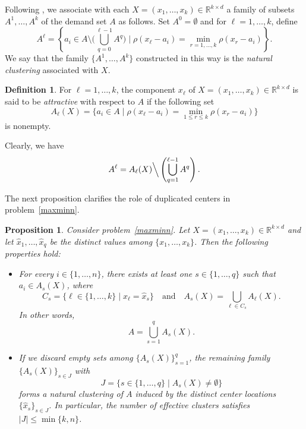 \documentclass[11pt]{article}
\newtheorem{proposition}[theorem]{Proposition}
\theoremstyle{definition}
\newtheorem{definition}[theorem]{Definition}
\newcommand{\R}{\mathbb{R}}
\newcommand{\1}{\mathbf{1}}
\begin{document}
Following \cite{Cuong2020,LNSYkcenter}, we associate with each
$X=(x_1,\ldots,x_k)\in\R^{k\times d}$ a family of subsets
$A^1,\ldots,A^k$ of the demand set $A$ as follows.  
Set $A^0=\emptyset$ and for $\ell=1,\ldots,k$, define
\[
A^\ell
=
\left\{a_i\in A\setminus\Big(\bigcup_{q=0}^{\ell-1}A^q\Big)\;\Big|\;
\rho(x_\ell-a_i)
=
\min_{r=1,\ldots,k}\rho(x_r-a_i)
\right\}.
\]
We say that the family $\{A^1,\ldots,A^k\}$ constructed in this way is the
\emph{natural clustering} associated with $X$.



\begin{definition}\label{def1}
For $\ell=1,\dots,k$, the component $x_\ell$ of $X=(x_1,\ldots,x_k)\in \R^{k\times d}$ is said to be \textit{attractive} with respect to $A$ if the following set
\begin{equation}\label{def:A_l}
A_\ell(X)=\Big\{a_i\in A \;\Big|\;
\rho(x_\ell-a_i)=\min_{1\le r\le k}\rho(x_r-a_i)
\Big\}    
\end{equation}
is nonempty.
\end{definition}
Clearly, we have
$$A^\ell=A_\ell(X)\Big\backslash\left(\bigcup_{q=1}^{\ell-1}A^q\right).$$

The next proposition clarifies the role of duplicated centers in problem~\eqref{maxminn}. 


\begin{proposition}\label{prop:natural-weaker}
Consider problem~\eqref{maxminn}. Let 
$X=(x_1,\dots,x_k)\in \R^{k\times d}$
and let $\widehat x_1,\dots,\widehat x_q$ be the distinct values among 
$\{x_1,\dots,x_k\}$. 
Then the following properties hold:
\begin{itemize}
\item[(i)] For every $i\in\{1,\dots,n\}$, there exists at least one 
$s\in\{1,\dots,q\}$ such that $a_i\in A_s(X)$, where
\[
 C_s=\{\ell\in\{1,\dots,k\}\mid x_\ell=\widehat x_s\}\quad\text{and}\quad
A_s(X)=\bigcup_{\ell\in C_s} A_\ell(X).
\]
In other words,
\[
A=\bigcup_{s=1}^q A_s(X).
\]

\item[(ii)] If we discard empty sets among $\{A_s(X)\}_{s=1}^q$, the remaining
family $\{A_s(X)\}_{s\in J}$ with
\[
J=\{s\in\{1,\dots,q\}\mid A_s(X)\neq\emptyset\}
\]
forms a natural clustering of $A$ induced by the distinct center locations
$\{\widehat x_s\}_{s\in J}$.
In particular, the number of \emph{effective} clusters satisfies
$|J|\le\min\{k,n\}$. 
\end{itemize}
\end{proposition}
\end{document}

